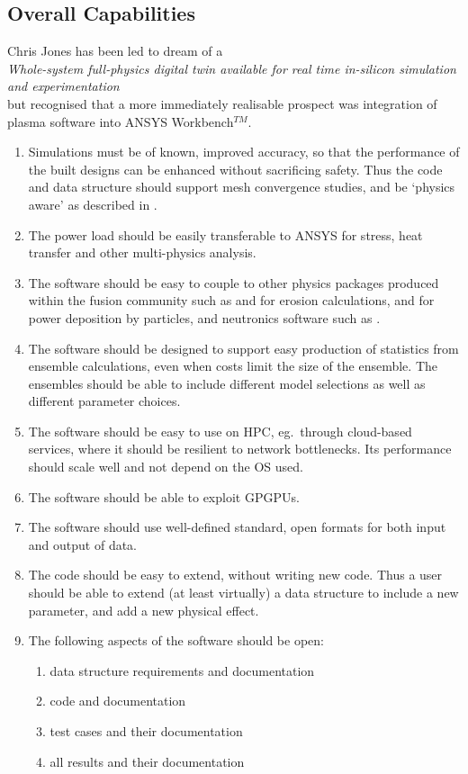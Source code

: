 \subsection{Overall Capabilities}\label{sec:RB2_overall}
Chris Jones has been led to dream of a \\
\emph{Whole-system full-physics digital twin available for real time in-silicon simulation and experimentation}\\
but recognised that a more immediately realisable prospect was integration of plasma software into ANSYS
Workbench$^{TM}$.

\begin{enumerate}
\item Simulations must be of known, improved accuracy, so that the performance of the
built designs can be enhanced without sacrificing safety.
Thus the code and data structure should support mesh convergence studies, and be `physics aware' as described
in .
\item The power load should be easily transferable to ANSYS for stress, heat transfer and other  multi-physics analysis.
\item The software should be easy to couple to other physics packages produced within the fusion
community such as  and  for erosion calculations,  and  for power
deposition by particles, and neutronics software such as .
\item The software should be designed to support easy production of statistics from ensemble calculations,
even when costs limit the size of the ensemble. The ensembles should be able to include different model
selections as well as different parameter choices.
\item The software should be easy to use on HPC, eg.\ through cloud-based services, where 
it should be resilient to  network bottlenecks.  Its performance
should scale well and  not depend on the OS used.
\item The software should be able to exploit GPGPUs.
\item The software should use well-defined standard, open formats for both input and output of data.
\item The code should be easy to extend, without writing new code. Thus a user should be able to
extend (at least virtually) a data structure to include a new parameter, and add a new physical effect.
\item The following aspects of the software should be open: 
\begin{enumerate}
\item data structure requirements and documentation
\item code and documentation
\item test cases and their documentation
\item all results and their documentation
\end{enumerate}
\end{enumerate}

